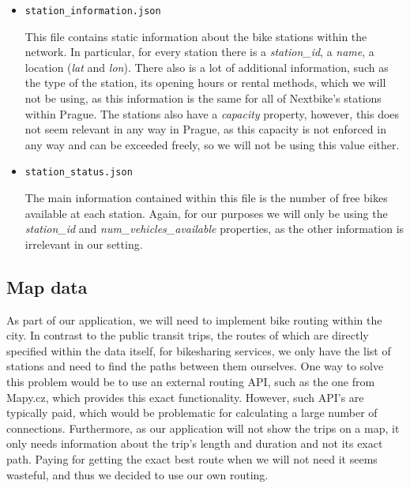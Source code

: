 \begin{itemize}
    \item \texttt{station\_information.json}

    This file contains static information about the bike stations within the network. In particular, for every station there is a \textit{station\_id}, a \textit{name}, a location (\textit{lat} and \textit{lon}). There also is a lot of additional information, such as the type of the station, its opening hours or rental methods, which we will not be using, as this information is the same for all of Nextbike's stations within Prague. The stations also have a \textit{capacity} property, however, this does not seem relevant in any way in Prague, as this capacity is not enforced in any way and can be exceeded freely, so we will not be using this value either.

    \item \texttt{station\_status.json}

    The main information contained within this file is the number of free bikes available at each station. Again, for our purposes we will only be using the \textit{station\_id} and \textit{num\_vehicles\_available} properties, as the other information is irrelevant in our setting.
\end{itemize}



\subsection{Map data}

As part of our application, we will need to implement bike routing within the city. In contrast to the public transit trips, the routes of which are directly specified within the data itself, for bikesharing services, we only have the list of stations and need to find the paths between them ourselves. One way to solve this problem would be to use an external routing API, such as the one from Mapy.cz, which provides this exact functionality\cite{mapyczapi}. However, such API's are typically paid, which would be problematic for calculating a large number of connections. Furthermore, as our application will not show the trips on a map, it only needs information about the trip's length and duration and not its exact path. Paying for getting the exact best route when we will not need it seems wasteful, and thus we decided to use our own routing.

